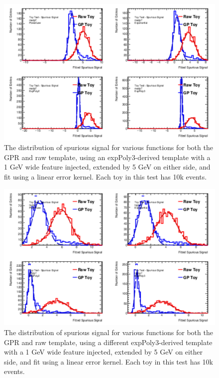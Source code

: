 \begin{figure} 
\begin{center}
  \includegraphics[width=\textwidth]{figures/background/gpr/validation/linear/ToyTest_FitSigVals_medpT_10k_Sig_1s}   
\caption{The distribution of spurious signal for various functions for both the GPR and raw template, using an expPoly3-derived template with a 1 GeV wide feature injected, extended by 5 GeV on either side, and fit using a linear error kernel. Each toy in this test has 10k events.}
\label{fig:linearkernel_medpt_10k_Sig_1s}
\end{center}
\end{figure}

\begin{figure} 
\begin{center}
  \includegraphics[width=\textwidth]{figures/background/gpr/validation/linear/ToyTest_FitSigVals_highpT_10k_Sig_1s}   
\caption{The distribution of spurious signal for various functions for both the GPR and raw template, using a different expPoly3-derived template with a 1 GeV wide feature injected, extended by 5 GeV on either side, and fit using a linear error kernel. Each toy in this test has 10k events.}
\label{fig:linearkernel_highpt_10k_Sig_1s}
\end{center}
\end{figure}

